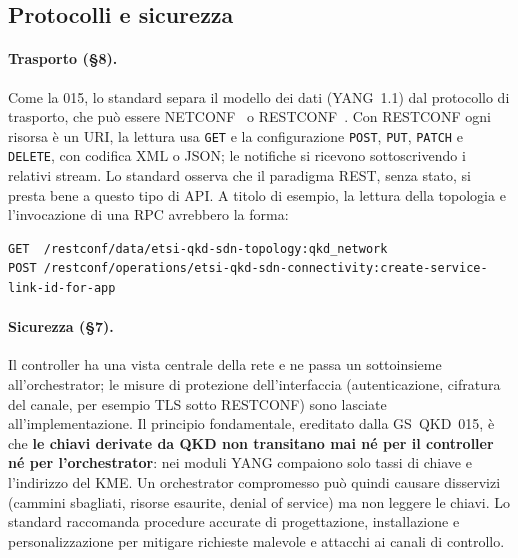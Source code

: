 \subsection{Protocolli e sicurezza}
\label{sec:protocolli}

\paragraph{Trasporto (§8).}
Come la 015, lo standard separa il modello dei dati (YANG~1.1) dal
protocollo di trasporto, che può essere NETCONF~\cite{rfc6241} o
RESTCONF~\cite{rfc8040}. Con RESTCONF ogni risorsa è un URI, la lettura usa
\texttt{GET} e la configurazione \texttt{POST}, \texttt{PUT},
\texttt{PATCH} e \texttt{DELETE}, con codifica XML o JSON; le notifiche si
ricevono sottoscrivendo i relativi stream. Lo standard osserva che il
paradigma REST, senza stato, si presta bene a questo tipo di API. A titolo
di esempio, la lettura della topologia e l'invocazione di una RPC avrebbero
la forma:
\begin{lstlisting}
GET  /restconf/data/etsi-qkd-sdn-topology:qkd_network
POST /restconf/operations/etsi-qkd-sdn-connectivity:create-service-link-id-for-app
\end{lstlisting}

\paragraph{Sicurezza (§7).}
Il controller ha una vista centrale della rete e ne passa un sottoinsieme
all'orchestrator; le misure di protezione dell'interfaccia (autenticazione,
cifratura del canale, per esempio TLS sotto RESTCONF) sono lasciate
all'implementazione. Il principio fondamentale, ereditato dalla GS~QKD~015,
è che \textbf{le chiavi derivate da QKD non transitano mai né per il
controller né per l'orchestrator}: nei moduli YANG compaiono solo tassi di
chiave e l'indirizzo del KME. Un orchestrator compromesso può quindi
causare disservizi (cammini sbagliati, risorse esaurite, denial of service)
ma non leggere le chiavi. Lo standard raccomanda procedure accurate di
progettazione, installazione e personalizzazione per mitigare richieste
malevole e attacchi ai canali di controllo.
